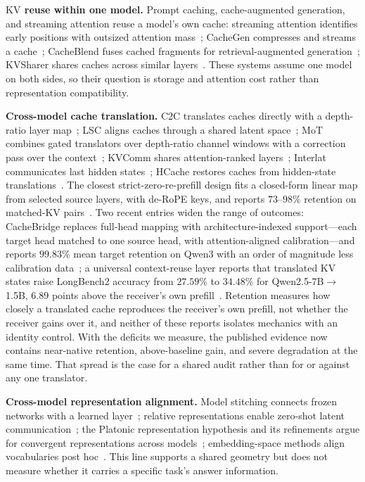 \documentclass{article} %
\newcommand{\kv}{\ensuremath{\mathrm{KV}}}
\begin{document}
\textbf{\kv{} reuse within one model.} Prompt caching, cache-augmented
generation, and streaming attention reuse a model's own cache: streaming
attention identifies early positions with outsized attention
mass~\citep{streamingsink2023}; CacheGen compresses and streams a
cache~\citep{cachegen2024}; CacheBlend fuses cached fragments for
retrieval-augmented generation~\citep{cacheblend2025}; KVSharer shares caches
across similar layers~\citep{kvsharer2024}. These systems assume one model on
both sides, so their question is storage and attention cost rather than
representation compatibility.

\textbf{Cross-model cache translation.} C2C translates caches directly with a
depth-ratio layer map~\citep{c2c2025}; LSC aligns caches through a shared latent
space~\citep{lsc2026}; MoT combines gated translators over depth-ratio channel
windows with a correction pass over the context~\citep{mot2026}; KVComm shares
attention-ranked layers~\citep{kvcomm2025}; Interlat communicates last hidden
states~\citep{interlat2025}; HCache restores caches from hidden-state
translations~\citep{hcache2025}. The closest strict-zero-re-prefill design fits
a closed-form linear map from selected source layers, with de-RoPE keys, and
reports $73$--$98\%$ retention on matched-\kv{} pairs~\citep{heo2026}.
Two recent entries widen the range of outcomes: CacheBridge replaces full-head
mapping with architecture-indexed support---each target head matched to one
source head, with attention-aligned calibration---and reports $99.83\%$ mean
target retention on Qwen3 with an order of magnitude less calibration
data~\citep{cachebridge2026}; a universal context-reuse layer reports that
translated \kv{} states raise LongBench2 accuracy from $27.59\%$ to $34.48\%$
for Qwen2.5-7B$\to$1.5B, $6.89$ points above the receiver's own
prefill~\citep{contextreuse2026}. Retention measures how closely a translated
cache reproduces the receiver's own prefill, not whether the receiver gains over
it, and neither of these reports isolates mechanics with an identity control.
With the deficits we measure, the published evidence now contains near-native
retention, above-baseline gain, and severe degradation at the same time. That
spread is the case for a shared audit rather than for or against any one
translator.

\textbf{Cross-model representation alignment.} Model stitching connects frozen
networks with a learned layer~\citep{stitching2021}; relative representations
enable zero-shot latent communication~\citep{relrep2022}; the Platonic
representation hypothesis and its refinements argue for convergent
representations across models~\citep{platonic2024,perfectplatonic2025,aristotelian2026};
embedding-space methods align vocabularies post hoc~\citep{vec2vec2025}. This
line supports a shared geometry but does not measure whether it carries a
specific task's answer information.
\end{document}
